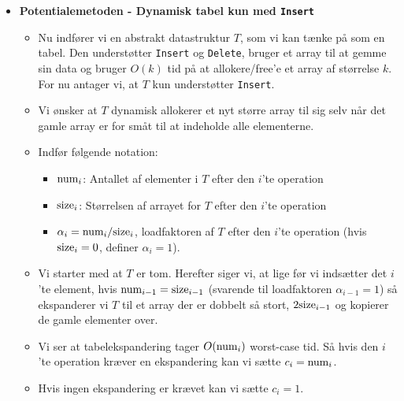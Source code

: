 \begin{itemize}
\item \textbf{Potentialemetoden - Dynamisk tabel kun med \texttt{Insert}}
\begin{itemize}
	\item Nu indfører vi en abstrakt datastruktur $T$, som vi kan tænke på som en tabel. Den understøtter \texttt{Insert} og \texttt{Delete}, bruger et array til at gemme sin data og bruger $O(k)$ tid på at allokere/free'e et array af størrelse $k$. For nu antager vi, at $T$ kun understøtter \texttt{Insert}.
	\item Vi ønsker at $T$ dynamisk allokerer et nyt større array til sig selv når det gamle array er for småt til at indeholde alle elementerne.
	\item Indfør følgende notation:
	\begin{itemize}
		\item ${\textrm{num} }_i$: Antallet af elementer i $T$ efter den $i$'te operation
		\item ${\textrm{size} }_i$: Størrelsen af arrayet for $T$ efter den $i$'te operation
		\item $\alpha_i = {\textrm{num} }_i / {\textrm{size} }_i$, loadfaktoren af $T$ efter den $i$'te operation (hvis ${\textrm{size} }_i = 0$, definer $\alpha_i = 1$). 
	\end{itemize}
	\item Vi starter med at $T$ er tom. Herefter siger vi, at lige før vi indsætter det $i$'te element, hvis ${\textrm{num} }_{i-1} = {\textrm{size} }_{i-1}$ (svarende til loadfaktoren $\alpha_{i-1} = 1$) så ekspanderer vi $T$ til et array der er dobbelt så stort, $2 {\textrm{size} }_{i-1}$ og kopierer de gamle elementer over.
	\item Vi ser at tabelekspandering tager $O({\textrm{num} }_i)$ worst-case tid. Så hvis den $i$'te operation kræver en ekspandering kan vi sætte $c_i = {\textrm{num} }_i$.
	\item Hvis ingen ekspandering er krævet kan vi sætte $c_i = 1$.\\
	

\end{itemize}
\end{itemize}
